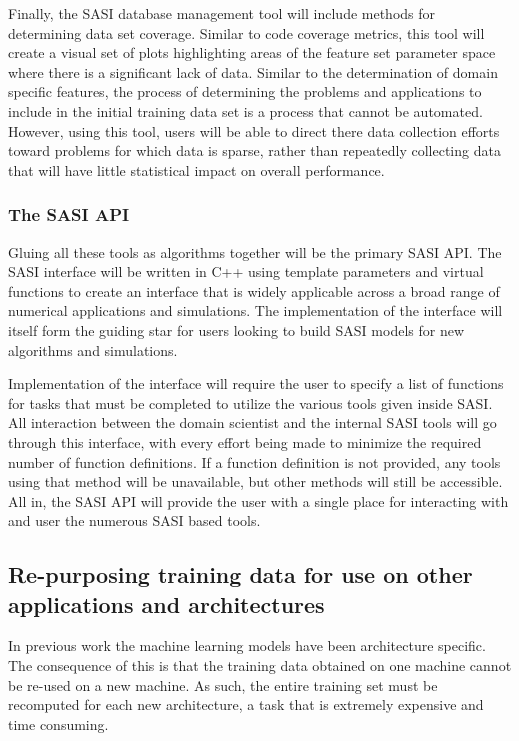Finally, the SASI database management tool will include methods for determining data set coverage. Similar to code coverage metrics, this tool will create a visual set of plots highlighting areas of the feature set parameter space where there is a significant lack of data.  Similar to the determination of domain specific features, the process of determining the problems and applications to include in the initial training data set is a process that cannot be automated. However, using this tool, users will be able to direct there data collection efforts toward problems for which data is sparse, rather than repeatedly collecting data that will have little statistical impact on overall performance. 
  
\subsubsection{The SASI API} 
Gluing all these tools as algorithms together will be the primary SASI API. The SASI interface will be written in C++ using template parameters and virtual functions to create an interface that is widely applicable across a broad range of numerical applications and simulations. The implementation of the interface will itself form the guiding star for users looking to build SASI models for new algorithms and simulations. 

Implementation of the interface will require the user to specify a list of functions for tasks that must be completed to utilize the various tools given inside SASI. All interaction between the domain scientist and the internal SASI tools will go through this interface, with every effort being made to minimize the required number of function definitions. If a function definition is not provided, any tools using that method will be unavailable, but other methods will still be accessible. All in, the SASI API will provide the user with a single place for interacting with and user the numerous SASI based tools. 

\subsection{ Re-purposing training data for use on other applications and architectures }

In previous work the machine learning models have been architecture specific. The consequence of this is that the training data 
obtained on one machine cannot be re-used on a new machine. As such, the entire training set must be recomputed for each new architecture, a task 
that is extremely expensive and time consuming. 




